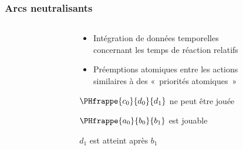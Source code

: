 
\begin{frame}[c]
  \frametitle{Arcs neutralisants}

\begin{columns}
\begin{column}{.4\textwidth}


\end{column}
\begin{column}{.55\textwidth}
\begin{center}

\begin{itemize}
  \item Intégration de données temporelles\\
    concernant les temps de réaction relatifs
  \item Préemptions atomiques entre les actions\\
    similaires à des «~priorités atomiques~»
\end{itemize}

\vspace*{1cm}
$\PHfrappe{c_0}{d_0}{d_1}$ ne peut être jouée 

\bigskip
$\PHfrappe{a_0}{b_0}{b_1}$ est jouable

\bigskip
\f $d_1$ est  atteint après $b_1$

\end{center}
\end{column}
\end{columns}


\end{frame}
